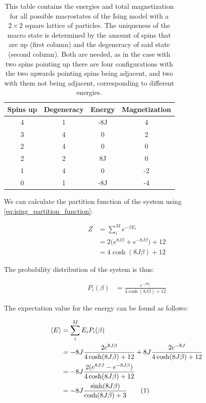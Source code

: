 \documentclass[reprint,english,notitlepage]{revtex4-1}  %
\newcommand\numberthis{\addtocounter{equation}{1}\tag{\theequation}}
\begin{document}
\begin{table}[H]
\centering
\caption{This table contains the energies and total magnetization for all possible macrostates of the Ising model with a $2\times 2$ square lattice of particles. The uniqueness of the macro state is determined by the amount of spins that are up (first column) and the degeneracy of said state (second column). Both are needed, as in the case with two spins pointing up there are four configurations with the two upwards pointing spins being adjacent, and two with them not being adjacent, corresponding to different energies.} \label{table:2x2_sq_lattice_en_and_mag}
\begin{tabular}{|c|c|c|c|}
\hline
Spins up & Degeneracy & Energy & Magnetization \\
\hline
4 & 1 & -8J & 4 \\
3 & 4 & 0 & 2 \\
2 & 4 & 0 & 0 \\
2 & 2 & 8J & 0 \\
1 & 4 & 0 & -2 \\
0 & 1 & -8J & -4 \\
\hline
\end{tabular}
\end{table}


We can calculate the partition function of the system using \eqref{eq:ising_partition_function}:

\begin{align*}
Z &= \sum\limits_i^M e^{-\beta E_i} \\
&= 2 \bigg(e^{8J\beta} + e^{-8J\beta} \bigg) + 12 \\
&= 4\cosh(8J\beta) + 12
\end{align*}

The probability distribution of the system is thus:

\begin{align*}
P_i(\beta) &= \frac{e^{-\beta E_i}}{4\cosh (8J\beta) + 12}
\end{align*}

The expectation value for the energy can be found as follows:

\begin{align*}
\langle E \rangle &= \sum\limits_i^M E_i P_i(\beta) \\
 &= -8J \frac{2e^{8J\beta}}{4\cosh (8J\beta) + 12} + 8J \frac{2e^{-8J}}{4\cosh (8J\beta) + 12} \\
 &= -8J\frac{2(e^{8J\beta} - e^{-8J\beta})}{4\cosh (8J\beta) + 12} \\
 &= -8J\frac{\sinh(8J\beta) }{\cosh (8J\beta) + 3} \numberthis \label{eq:2x2_energy}
\end{align*}
\end{document}
